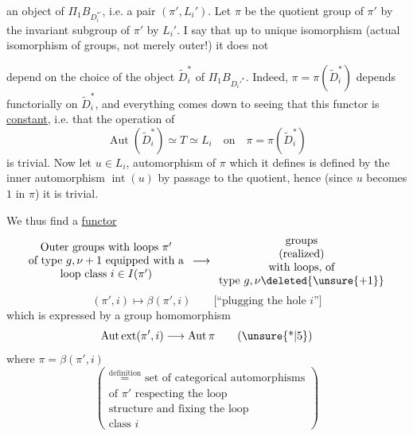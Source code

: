  an object of \(\Pi_1B_{D_i^{*'}}\), i.e. a pair \((\pi',L_i')\). Let \(\pi\) be the quotient group of \(\pi'\) by the invariant subgroup of \(\pi'\)   by \(L_i'\). I say \margin{\(\Vert\)} that up to unique isomorphism (actual isomorphism of groups, not merely outer!) it does not


depend on the choice of the object \(\widetilde D_i^*\) of \(\Pi_1B_{D_i'^*}\). Indeed, \(\pi=\pi(\widetilde D_i^*)\) depends functorially on \(\widetilde D_i^*\), and everything comes down to seeing that this functor is \uline{constant}, i.e. that the operation of
\[
\operatorname{Aut}(\widetilde D_i^*)\simeq T\simeq L_i
\quad\text{on}\quad
\pi=\pi(\widetilde D_i^*)
\]
is trivial. Now let \(u\in L_i\),  automorphism of \(\pi\) which it defines is defined by the inner automorphism \(\operatorname{int}(u)\) by passage to the quotient, hence (since \(u\) becomes \(1\) in \(\pi\)) it is trivial. 

We thus find a \uline{functor}
\[
\begin{array}{c}
\text{Outer groups with loops }\pi'\\
\text{of type }g,\nu+1\text{ equipped with a}\\
\text{loop class }i\in I(\pi')
\end{array}
\longrightarrow
\begin{array}{c}
\text{groups}\\
\text{(realized)}\\
\text{with loops, of}\\
\text{type }g,\nu\deleted{\unsure{+1}}
\end{array}
\]
\[
(\pi',i)\longmapsto\beta(\pi',i)
\qquad
\text{[``plugging the hole \(i\)'']}
\]
which is expressed by a group homomorphism
\[
\operatorname{Aut\,ext}(\pi',i)\longrightarrow\operatorname{Aut}\pi
\tag{\unsure{*|5}}
\]
where \(\pi=\beta(\pi',i)\)
\[
\left(
\begin{array}{l}
\overset{\text{definition}}{=}\text{ set of categorical automorphisms}\\
\text{of }\pi'\text{ respecting the loop}\\
\text{structure and fixing the loop}\\
\text{class }i
\end{array}
\right)
\]


